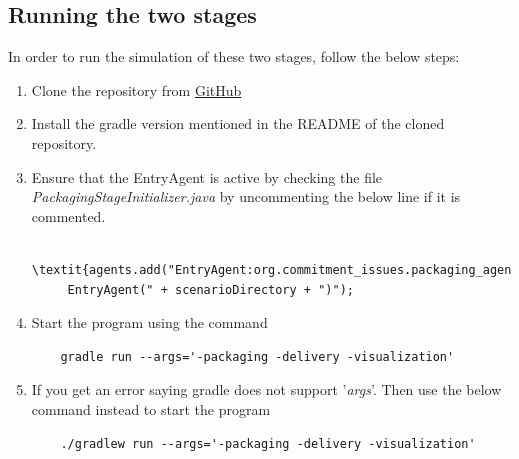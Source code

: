 \documentclass[11pt, a4paper]{article}
\begin{document}
\subsection{Running the two stages}
In order to run the simulation of these two stages, follow the below steps:
\begin{enumerate}
	\item Clone the repository from \href{https://github.com/HBRS-MAAS/ws18-project-commitment_issues}{GitHub}
	\item Install the gradle version mentioned in the README of the cloned repository.
	\item Ensure that the EntryAgent is active by checking the file \textit{PackagingStageInitializer.java} by uncommenting the below line if it is commented.
	\begin{verbatim}	 \textit{agents.add("EntryAgent:org.commitment_issues.packaging_agents.
	 EntryAgent(" + scenarioDirectory + ")"); \end{verbatim} 
	\item Start the program using the command
	\begin{verbatim}
	gradle run --args='-packaging -delivery -visualization'
	\end{verbatim}
	\item If you get an error saying gradle does not support '\textit{args}'. Then use the below command instead to start the program
	\begin{verbatim}
	./gradlew run --args='-packaging -delivery -visualization'
	\end{verbatim}
\end{enumerate}
\end{document}
